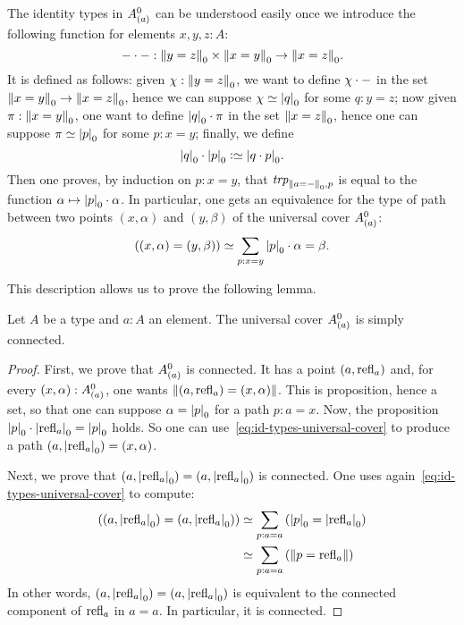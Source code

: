 The identity types in ${{A}^0_{\left(a\right)}}$ can be understood easily once
we introduce the following function for elements $x,y,z:A$:
\begin{displaymath}
  {-}\cdot{-} : {\lVert y=z\rVert}_0 \times {\lVert x=y\rVert}_0 \to {\lVert x=z\rVert}_0.
\end{displaymath}
It is defined as follows: given $\chi : {\lVert y=z\rVert}_0$, we want to
define $\chi\cdot{-}$ in the set
${\lVert x=y\rVert}_0 \to {\lVert x=z\rVert}_0$, hence we can suppose
$\chi\jdeq\settrunc q$ for some $q:y=z$; now given
$\pi:{\lVert x=y\rVert}_0$, one want to define ${\lvert q\rvert}_0 \cdot \pi$ in
the set ${\lVert x=z\rVert}_0$, hence one can suppose $\pi\jdeq\settrunc p$
for some $p:x=y$; finally, we define
\begin{displaymath}
  \settrunc{q} \cdot \settrunc{p} \defequi \settrunc{q\cdot p}.
\end{displaymath}
Then one proves, by induction on $p:x=y$, that
$\trp[\setTrunc{a=\blank}]p$ is equal to the function
$\alpha\mapsto {\lvert p\rvert}_0\cdot \alpha$. In particular, one gets an
equivalence for the type of path between two points $(x,\alpha)$ and
$(y,\beta)$ of the universal cover ${{A}^0_{\left(a\right)}}$:
\begin{equation}
  \label{eq:id-types-universal-cover}%
  \left((x,\alpha) = (y,\beta)\right)
  \weq \sum_{p:x=y}\settrunc{p} \cdot \alpha = \beta.
\end{equation}

This description allows us to prove the following lemma.
\begin{lemma}
  \label{lemma:universal-cover-simply-connected}%
  Let $A$ be a type and $a:A$ an element. The universal cover
  ${{A}^0_{\left(a\right)}}$ is simply connected.
\end{lemma}
\begin{proof}
  First, we prove that ${{A}^0_{\left(a\right)}}$ is connected. It has a point
  $(a,\refl a)$ and, for every $(x,\alpha):{{A}^0_{\left(a\right)}}$, one wants
  $\Trunc{(a,\refl a) = (x,\alpha)}$. This is proposition, hence a
  set, so that one can suppose $\alpha = {\lvert p\rvert}_0$ for a path
  $p:a=x$. Now, the proposition
  $\settrunc p \cdot \settrunc {\refl a} = \settrunc p$ holds. So one
  can use~\cref{eq:id-types-universal-cover} to produce a path
  $(a,\settrunc{\refl a}) = (x,\alpha)$.

  Next, we prove that
  $(a,\settrunc{\refl a}) = (a,\settrunc{\refl a})$ is connected. One
  uses again~\cref{eq:id-types-universal-cover} to compute:
  \begin{align*}
    \left((a,\settrunc{\refl a}) = (a,\settrunc{\refl a})\right)
    &\weq \sum_{p:a=a}\left( \settrunc p = \settrunc{\refl a} \right)
    \\
    &\weq \sum_{p:a=a}\left( \Trunc {p = \refl a} \right) 
  \end{align*}
  In other words, $(a,\settrunc{\refl a}) = (a,\settrunc{\refl a})$ is
  equivalent to the connected component of $\refl a$ in $a=a$. In
  particular, it is connected.
\end{proof}


